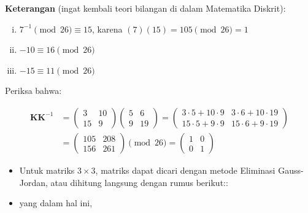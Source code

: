 \documentclass{article}
\begin{document}
\textbf{Keterangan} (ingat kembali teori bilangan di dalam Matematika Diskrit):
\begin{enumerate}[(i)]
\item $7^{-1} \pmod{26} \equiv 15$, karena $(7)(15) = 105 \pmod{26} = 1$
\item $-10 \equiv 16 \pmod{26}$
\item $-15 \equiv 11 \pmod{26}$ 
\end{enumerate}

\newpage


Periksa bahwa:

\begin{align*}
\mathbf{KK}^{-1} &= \begin{pmatrix} 3 & 10 \\ 15 & 9 \end{pmatrix} \begin{pmatrix} 5 & 6 \\ 9 & 19 \end{pmatrix} = \begin{pmatrix} 3\cdot 5 + 10\cdot 9 & 3\cdot 6 + 10\cdot 19 \\ 15\cdot 5 + 9\cdot 9 & 15\cdot 6 + 9\cdot 19 \end{pmatrix} \\ &= \begin{pmatrix} 105 & 208 \\ 156 & 261 \end{pmatrix} \pmod{26} = \begin{pmatrix} 1 & 0 \\ 0 & 1 \end{pmatrix}
\end{align*}

\newpage


\begin{itemize}
    \item Untuk matriks $3 \times 3$, matriks dapat dicari dengan metode Eliminasi Gauss-Jordan, atau dihitung langsung dengan rumus berikut::
\end{itemize}

\vspace{10mm}

\begin{itemize}
    \item yang dalam hal ini,
\end{itemize}
\end{document}
